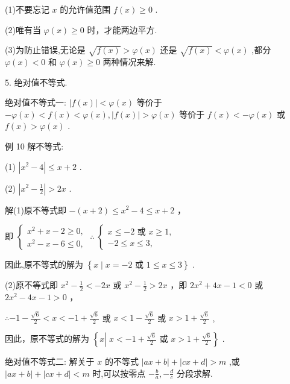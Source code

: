 \documentclass[10pt]{article}
\begin{document}
(1)不要忘记 \(x\) 的允许值范围 \(f\left( x\right)  \geq  0\) .

(2)唯有当 \(\varphi \left( x\right)  \geq  0\) 时，才能两边平方.

(3)为防止错误,无论是 \(\sqrt{f\left( x\right) } > \varphi \left( x\right)\) 还是 \(\sqrt{f\left( x\right) } < \varphi \left( x\right)\) ,都分 \(\varphi \left( x\right)  < 0\) 和 \(\varphi \left( x\right)  \geq  0\) 两种情况来解.

5. 绝对值不等式.

绝对值不等式一: \(\left| {f\left( x\right) }\right|  < \varphi \left( x\right)\) 等价于 \(- \varphi \left( x\right)  < f\left( x\right)  < \varphi \left( x\right) ,\left| {f\left( x\right) }\right|  > \varphi \left( x\right)\) 等价于 \(f\left( x\right)  <  - \varphi \left( x\right)\) 或 \(f\left( x\right)  > \varphi \left( x\right)\) .

例 10 解不等式:

(1) \(\left| {{x}^{2} - 4}\right|  \leq  x + 2\) .

(2) \(\left| {{x}^{2} - \frac{1}{2}}\right|  > {2x}\) .

解(1)原不等式即 \(- \left( {x + 2}\right)  \leq  {x}^{2} - 4 \leq  x + 2\) ，

即 \(\left\{  {\begin{array}{l} {x}^{2} + x - 2 \geq  0, \\  {x}^{2} - x - 6 \leq  0, \end{array}\;\therefore \;\left\{  \begin{array}{l} x \leq   - 2\text{ 或 }x \geq  1, \\   - 2 \leq  x \leq  3, \end{array}\right. }\right.\)

因此,原不等式的解为 \(\left\{  {x \mid  x =  - 2\text{ 或 }1 \leq  x \leq  3}\right\}\) .

(2)原不等式即 \({x}^{2} - \frac{1}{2} <  - {2x}\) 或 \({x}^{2} - \frac{1}{2} > {2x}\) ，即 \(2{x}^{2} + {4x} - 1 < 0\) 或 \(2{x}^{2} - {4x} - 1 > 0\) ，

\(\therefore  - 1 - \frac{\sqrt{6}}{2} < x <  - 1 + \frac{\sqrt{6}}{2}\) 或 \(x < 1 - \frac{\sqrt{6}}{2}\) 或 \(x > 1 + \frac{\sqrt{6}}{2}\) ,

因此，原不等式的解为 \(\left\{  {x\left| {\;x <  - 1 + \frac{\sqrt{6}}{2}}\right. \text{ 或 }x > 1 + \frac{\sqrt{6}}{2}}\right\}\) .

绝对值不等式二: 解关于 \(x\) 的不等式 \(\left| {{ax} + b}\right|  + \left| {{cx} + d}\right|  > m\) ,或 \(\left| {{ax} + b}\right|  + \left| {{cx} + d}\right|  < m\) 时,可以按零点 \(- \frac{b}{a}, - \frac{d}{c}\) 分段求解.
\end{document}
